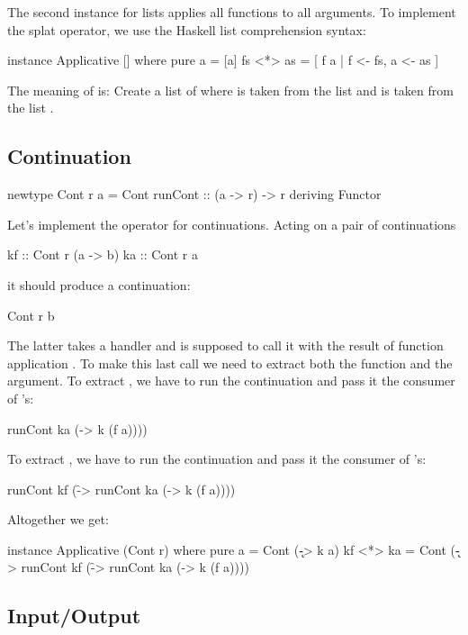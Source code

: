 \documentclass[DaoFP]{subfiles}
\begin{document}
The second  instance for lists applies all functions to all arguments. To implement the splat operator, we use the Haskell list comprehension syntax:
\begin{haskell}
instance Applicative [] where
  pure a = [a]
  fs <*> as = [ f a | f <- fs, a <- as ]
\end{haskell}
The meaning of \hask{[f a | f <- fs, a <- as]} is: Create a list of  where  is taken from the list  and  is taken from the list .

\subsection{Continuation}
\begin{haskell}
newtype Cont r a = Cont { runCont :: (a -> r) -> r }
  deriving Functor
\end{haskell}

Let's implement the \hask{<*>} operator for continuations. Acting on a pair of continuations 
\begin{haskell}
kf :: Cont r (a -> b)
ka :: Cont r a
\end{haskell}
it should produce a continuation:
\begin{haskell}
Cont r b
\end{haskell}
The latter takes a handler  and is supposed to call it with the result of function application . To make this last call we need to extract both the function and the argument. To extract , we have to run the continuation  and pass it the consumer of 's:
\begin{haskell}
runCont ka (\a -> k (f a))))
\end{haskell}
To extract , we have to run the continuation  and pass it the consumer of 's:
\begin{haskell}
runCont kf (\f -> runCont ka (\a -> k (f a))))
\end{haskell}
Altogether we get:
\begin{haskell}
instance Applicative (Cont r) where
  pure a = Cont (\k -> k a)
  kf <*> ka = Cont (\k -> 
        runCont kf (\f -> 
        runCont ka (\a -> k (f a))))
\end{haskell}

\subsection{Input/Output}
\end{document}
